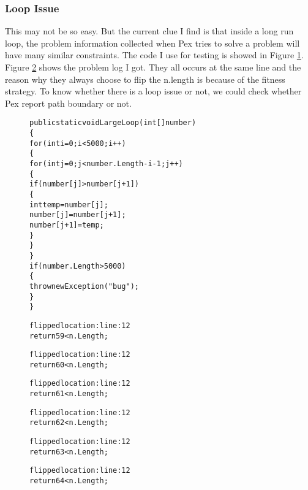 \subsubsection{Loop Issue}
This may not be so easy. But the current clue I find is that inside a long run loop, the problem information collected when Pex tries to solve a problem will have many similar constraints. The code I use for testing is showed in Figure \ref{fig:loop}. Figure \ref{fig:problem} shows the problem log I got. They all occurs at the same line and the reason why they always choose to flip the n.length is because of the fitness strategy. To know whether there is a loop issue or not, we could check whether Pex report path boundary or not.

\begin{figure}
\begin{CodeOut}
\begin{alltt}
public static void LargeLoop(int[] number)
\{
     for (int i = 0; i < 5000; i++)
     \{
          for (int j = 0; j < number.Length - i - 1; j++)
          \{
              if (number[j] > number[j + 1])
              \{
                  int temp = number[j];
                  number[j] = number[j + 1];
                  number[j + 1] = temp;
              \}
          \}
     \}
     if (number.Length > 5000)
     \{
          throw new Exception("bug");
     \}
\}
\end{alltt}
\end{CodeOut}
\label{fig:loop}
\end{figure}

        
\begin{figure}
\begin{CodeOut}
\begin{alltt}
flipped location:  line: 12
return 59 < n.Length;

flipped location:  line: 12
return 60 < n.Length;

flipped location:   line: 12
return 61 < n.Length;

flipped location:  line: 12
return 62 < n.Length;

flipped location:  line: 12
return 63 < n.Length;

flipped location:  line: 12
return 64 < n.Length;
\end{alltt}
\end{CodeOut}
\label{fig:problem}
\end{figure}



